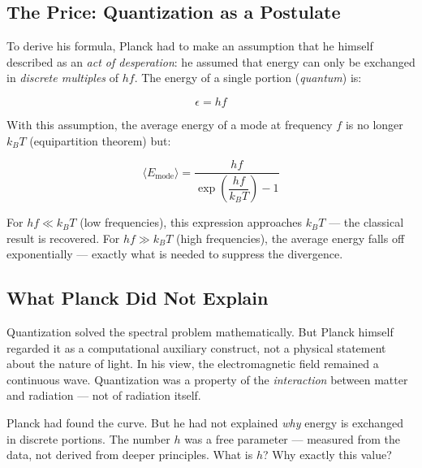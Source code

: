 \subsection{The Price: Quantization as a Postulate}

To derive his formula, Planck had to make an assumption that he himself described as 
an \emph{act of desperation}: he assumed that energy can only be exchanged in 
\emph{discrete multiples} of $hf$. The energy of a single portion (\emph{quantum}) is:

\begin{equation}
    \epsilon = hf
    \label{eq:planck_quantum}
\end{equation}

With this assumption, the average energy of a mode at frequency $f$ is no longer 
$k_BT$ (equipartition theorem) but:

\begin{equation}
    \langle E_{\text{mode}} \rangle = \frac{hf}{\exp\!\left(\dfrac{hf}{k_BT}\right) - 1}
    \label{eq:planck_mean_energy}
\end{equation}

For $hf \ll k_BT$ (low frequencies), this expression approaches $k_BT$ — the 
classical result is recovered. For $hf \gg k_BT$ (high frequencies), the average 
energy falls off exponentially — exactly what is needed to suppress the divergence.

\subsection{What Planck Did Not Explain}

Quantization solved the spectral problem mathematically. But Planck himself regarded 
it as a computational auxiliary construct, not a physical statement about the nature 
of light. In his view, the electromagnetic field remained a continuous wave. 
Quantization was a property of the \emph{interaction} between matter and radiation — 
not of radiation itself.

\begin{keyresult}
    Planck had found the curve. But he had not explained \emph{why} energy is 
    exchanged in discrete portions. The number $h$ was a free parameter — measured 
    from the data, not derived from deeper principles. What is $h$? Why exactly 
    this value?
\end{keyresult}

\clearpage

